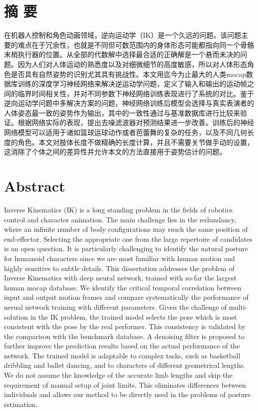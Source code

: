 \chapter*{摘 \quad 要}
在机器人控制和角色动画领域，逆向运动学（IK）是一个久远的问题。该问题主要的难点在于冗余性，也就是不同但可数范围内的身体形态可能都指向同一个骨骼末梢执行器的位置。从全部的代数解中选择最合适的正确解是一个悬而未决的问题。因为人们对人体运动的熟悉度以及对细微细节的高度敏感，所以对人体形态角色是否具有自然姿势的识别尤其具有挑战性。本文用迄今为止最大的人类mocap数据库训练的深度学习神经网络来解决逆运动学问题，定义了输入和输出的运动帧之间的临界时间相关性，并对不同参数下神经网络训练表现进行了系统的对比。鉴于逆向运动学问题中多解决方案的问题，神经网络训练后模型会选择与真实表演者的人体姿态最一致的姿势作为输出，其中的一致性通过与基准数据库进行比较来验证。根据网络实际的表现，提出去噪滤波器对预测结果进一步改善。训练后的神经网络模型可以适用于诸如篮球运球动作或者芭蕾舞的复杂的任务，以及不同几何长度的角色。本文对肢体长度不做精确的长度计算，并且不需要关节做手动的设置，这消除了个体之间的差异性并允许本文的方法直接用于姿势估计的问题。


\clearpage

\chapter*{Abstract}

Inverse Kinematics (IK) is a long standing problem in the ﬁelds of robotics control and character animation. The main challenge lies in the redundancy, where an inﬁnite number of body conﬁgurations may reach the same position of end-effector. Selecting the appropriate one from the large repertoire of candidates is an open question. It is particularly challenging to identify the natural posture for humanoid characters since we are most familiar with human motion and highly sensitive to subtle details. This dissertation addresses the problem of Inverse Kinematics with deep neural network, trained with so-far the largest human mocap database. We identify the critical temporal correlation between input and output motion frames and compare systematically the performance of nerual network training with different parameters. Given the challenge of multi-solution in the IK problem, the trained model selects the pose which is most consistent with the pose by the real performer. This consistency is validated by the comparison with the benchmark database. A denoising filter is proposed to further improve the prediction results based on the actual performance of the network. The trained model is adaptable to complex tasks, such as basketball dribbling and ballet dancing, and to characters of different geometrical lengths. We do not assume the knowledge of the accurate limb lengths and skip the requirement of manual setup of joint limits. This  eliminates differences between individuals and allows our method to be directly used in the problems of posture estimation.


\cleardoublepage
